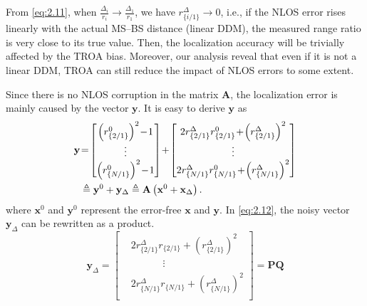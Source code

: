 \documentclass[journal]{IEEEtran}
\begin{document}
From \eqref{eq:2.11}, when ${\frac{\Delta {_{i}}}{{{r}_{i}}}\to \frac{\Delta {_{1}}}{{{r}_{1}}}}$, we have ${{ {{r}_{\{i/1\}}^{\Delta}}\to 0}}$, i.e., if the NLOS error rises linearly with the actual MS--BS distance (linear DDM), the measured range ratio is very close to its true value. Then, the localization accuracy will be trivially affected by the TROA bias. Moreover, our analysis reveal that even if it is not a linear DDM, TROA can still reduce the impact of NLOS errors to some extent.

Since there is no NLOS corruption in the matrix ${\mathbf{A}}$, the localization error is mainly caused by the vector ${\mathbf{y}}$. It is easy to derive ${\mathbf{y}}$ as
\begin{align}\label{eq:2.12}
   \mathbf{y} &\!=\!
   \begin{bmatrix}
   \left(r_{\{2/1\}}^{0}\right)^2 \!-\! 1 \\
   \vdots \\
   \left(r_{\{N/1\}}^{0}\right)^2 \!-\! 1
   \end{bmatrix}
   \!+\!
   \begin{bmatrix}
   2r_{\{2/1\}}^{\Delta} r_{\{2/1\}}^{0} \!+\! \left(r_{\{2/1\}}^{\Delta}\right)^2 \\
   \vdots \\
   2r_{\{N/1\}}^{\Delta} r_{\{N/1\}}^{0} \!+\! \left(r_{\{N/1\}}^{\Delta}\right)^2
   \end{bmatrix}\notag \\
   &\triangleq \mathbf{y}^0 + \mathbf{y}_{\Delta} 
   \triangleq \mathbf{A} \left(\mathbf{x}^0 + \mathbf{x}_{\Delta}\right).
   \end{align}  
\unskip where ${\mathbf{x}}^{0}$ and ${\mathbf{y}}^{0}$ represent the error-free ${\mathbf{x}}$ and ${\mathbf{y}}$. In \eqref{eq:2.12}, the noisy vector ${ \mathbf{y}_{\Delta}}$ can be rewritten as a product.
\begin{equation}\label{eq:2.13}
 \mathbf{y}_{\Delta}=\left[ \begin{aligned}
  & 2 {{r}_{\{2/1\}}^{\Delta}}{{r}_{\{2/1\}}}+\left(r_{\{2/1\}}^{\Delta }\right)^{2} \\
 & \begin{matrix}
   {} & {}  \\
\end{matrix}\begin{matrix}
   {}  \\
\end{matrix}\begin{matrix}
   {}  \\
\end{matrix}\vdots  \\
 & 2 {{r}_{\{N/1\}}^{\Delta}}{{r}_{\{N/1\}}}+ \left(r_{\{N/1\}}^{\Delta}\right)^{2} \\
\end{aligned} \right]=\mathbf{PQ}
\end{equation}
\end{document}
